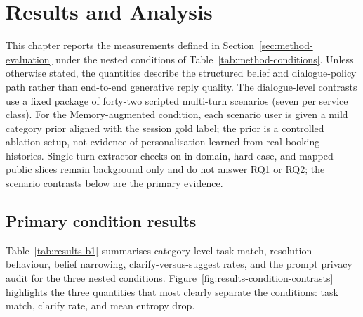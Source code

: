 
\chapter{Results and Analysis}
\label{ch:resultsAndAnalysis}

This chapter reports the measurements defined in Section~\ref{sec:method-evaluation} under the nested conditions of Table~\ref{tab:method-conditions}.
Unless otherwise stated, the quantities describe the structured belief and dialogue-policy path rather than end-to-end generative reply quality.
The dialogue-level contrasts use a fixed package of forty-two scripted multi-turn scenarios (seven per service class).
For the Memory-augmented condition, each scenario user is given a mild category prior aligned with the session gold label; the prior is a controlled ablation setup, not evidence of personalisation learned from real booking histories.
Single-turn extractor checks on in-domain, hard-case, and mapped public slices remain background only and do not answer RQ1 or RQ2; the scenario contrasts below are the primary evidence.

\section{Primary condition results}
\label{sec:results-primary}

Table~\ref{tab:results-b1} summarises category-level task match, resolution behaviour, belief narrowing, clarify-versus-suggest rates, and the prompt privacy audit for the three nested conditions.
Figure~\ref{fig:results-condition-contrasts} highlights the three quantities that most clearly separate the conditions: task match, clarify rate, and mean entropy drop.

